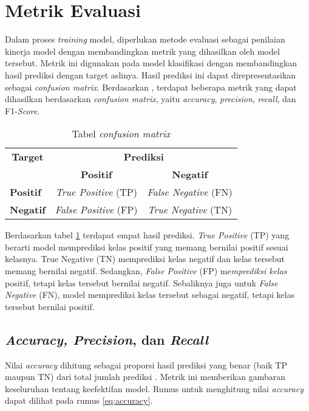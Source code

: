\section{Metrik Evaluasi}

Dalam proses \textit{training} model, diperlukan metode evaluasi sebagai penilaian kinerja model dengan membandingkan metrik yang dihasilkan oleh model tersebut. Metrik ini digunakan pada model klasifikasi dengan membandingkan hasil prediksi dengan target aslinya. Hasil prediksi ini dapat direpresentasikan sebagai \textit{confusion matrix}. Berdasarkan \citeauthor{metrics}, terdapat beberapa metrik yang dapat dihasilkan berdasarkan \textit{confusion matrix}, yaitu \textit{accuracy}, \textit{precision}, \textit{recall}, dan F1-\textit{Score}.

\begin{table}[ht]
    \vspace{0.25cm}
    \centering
    \caption{Tabel \textit{confusion matrix} \parencite{metrics}}
    \label{table:confusion-matrix}
    \begin{tabular}{l|c|c}
        \toprule
        \multicolumn{1}{c|}{\textbf{Target}} & \multicolumn{2}{c}{\textbf{Prediksi}} \\
        & \textbf{Positif} & \textbf{Negatif} \\
        \midrule
        \textbf{Positif} & \textit{True Positive} (TP) & \textit{False Negative} (FN) \\
        \textbf{Negatif} & \textit{False Positive} (FP) & \textit{True Negative} (TN) \\
        \bottomrule
    \end{tabular}
\end{table}

Berdasarkan tabel \ref{table:confusion-matrix} terdapat empat hasil prediksi. \textit{True Positive} (TP) yang berarti model memprediksi kelas positif yang memang bernilai positif sesuai kelasnya. True Negative (TN) memprediksi kelas negatif dan kelas tersebut memang bernilai negatif. Sedangkan, \textit{False Positive} (FP) me\textit{mprediksi kelas} positif, tetapi kelas tersebut bernilai negatif. Sebaliknya juga untuk \textit{False Negative} (FN), model memprediksi kelas tersebut sebagai negatif, tetapi kelas tersebut bernilai positif.

\subsection{\textit{Accuracy, Precision}, dan \textit{Recall}}
Nilai \textit{accuracy} dihitung sebagai proporsi hasil prediksi yang benar (baik TP maupun TN) dari total jumlah prediksi \parencite{metrics}. Metrik ini memberikan gambaran keseluruhan tentang keefektifan model. Rumus untuk menghitung nilai \textit{accuracy} dapat dilihat pada rumus \ref{eq:accuracy}.

